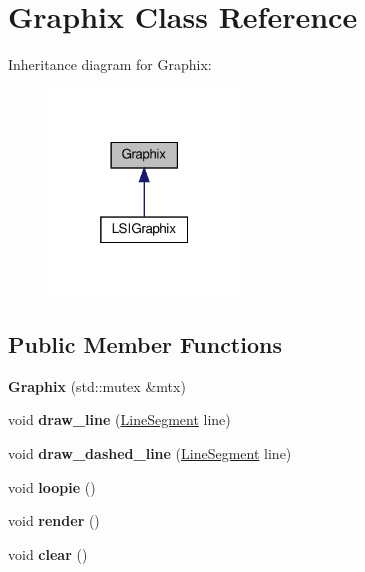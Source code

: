 \hypertarget{classGraphix}{}\section{Graphix Class Reference}
\label{classGraphix}


Inheritance diagram for Graphix\+:
\nopagebreak
\begin{figure}[H]
\begin{center}
\leavevmode
\includegraphics[width=145pt]{classGraphix__inherit__graph}
\end{center}
\end{figure}
\subsection*{Public Member Functions}
\begin{DoxyCompactItemize}
\item 
\mbox{\label{classGraphix_a1d4cb173e0d22fee13a657489b7b55de}} 
{\bfseries Graphix} (std\+::mutex \&mtx)
\item 
\mbox{\label{classGraphix_af2bd73aa70b282536cbfd2c19f0352bf}} 
void {\bfseries draw\+\_\+line} (\hyperlink{classLineSegment}{Line\+Segment} line)
\item 
\mbox{\label{classGraphix_af03ba028ad5bbb721a798c5b48450444}} 
void {\bfseries draw\+\_\+dashed\+\_\+line} (\hyperlink{classLineSegment}{Line\+Segment} line)
\item 
\mbox{\label{classGraphix_af7b539b3ab40274dc2f89d060cba0c51}} 
void {\bfseries loopie} ()
\item 
\mbox{\label{classGraphix_a3e24075d5ded3741a9c14a7978b721d8}} 
void {\bfseries render} ()
\item 
\mbox{\label{classGraphix_a1ac1a5725a869ef074da6fe3cab29b0e}} 
void {\bfseries clear} ()
\end{DoxyCompactItemize}
